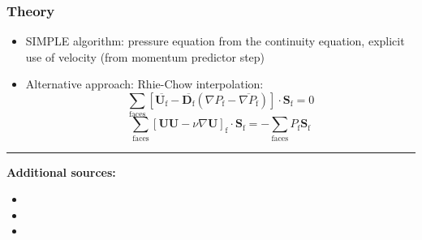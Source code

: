 \documentclass[9pt,handout]{beamer} %
\newcommand{\Ukrj}{\mathbf{U}}
\newcommand{\Sf}{\mathbf{S}_\mathrm{f}}
\newcommand{\Pp}{P}
\newcommand{\D}{\overline{\mathbf{D}_\mathrm{f}}}
\begin{document}
\begin{frame}%
\frametitle{Theory}
\begin{itemize}
    \item SIMPLE algorithm: pressure equation from the continuity equation, explicit use of velocity (from momentum predictor step)
    \pause
    \item Alternative approach: Rhie-Chow interpolation:
\begin{equation}
\label{eq:cont:rhie}
\displaystyle\sum_\mathrm{faces} \left[\overline{\Ukrj_\mathrm{f}}-\D\left(\nabla \Pp_\mathrm{f}-\overline{\nabla \Pp_\mathrm{f}}\right)\right]\cdot\Sf=0
\end{equation}
\begin{equation}
\label{eq:momentum:semi}
\displaystyle\sum_\mathrm{faces} \left[ \Ukrj \Ukrj- \nu\nabla\Ukrj \right]_\mathrm{f}\cdot\Sf=-\displaystyle\sum_\mathrm{faces} \Pp_\mathrm{f}\Sf
\end{equation}     
\end{itemize}

\vfill
\pause
\rule{0.5\textwidth}{0.5pt}\newline
\scriptsize
{\bf Additional sources:}
\begin{itemize}
    \item {}
    \item {}
    \item {}
\end{itemize}
\end{frame}
\end{document}
